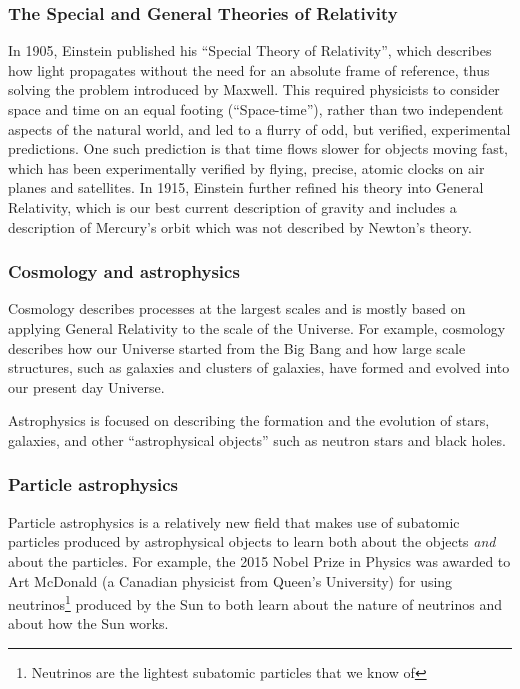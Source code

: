 \subsubsection{The Special and General Theories of Relativity}
In 1905, Einstein published his ``Special Theory of Relativity'', which describes how light propagates without the need for an absolute frame of reference, thus solving the problem introduced by Maxwell. This required physicists to consider space and time on an equal footing (``Space-time''), rather than two independent aspects of the natural world, and led to a flurry of odd, but verified, experimental predictions. One such prediction is that time flows slower for objects moving fast, which has been experimentally verified by flying, precise, atomic clocks on air planes and satellites. In 1915, Einstein further refined his theory into General Relativity, which is our best current description of gravity and includes a description of Mercury's orbit which was not described by Newton's theory.

\subsubsection{Cosmology and astrophysics} 
Cosmology describes processes at the largest scales and is mostly based on applying General Relativity to the scale of the Universe. For example, cosmology describes how our Universe started from the Big Bang and how large scale structures, such as galaxies and clusters of galaxies, have formed and evolved into our present day Universe. 

Astrophysics is focused on describing the formation and the evolution of stars, galaxies, and other ``astrophysical objects'' such as neutron stars and black holes. 

\subsubsection{Particle astrophysics}
Particle astrophysics is a relatively new field that makes use of subatomic particles produced by astrophysical objects to learn both about the objects \textit{and} about the particles. For example, the 2015 Nobel Prize in Physics was awarded to Art McDonald (a Canadian physicist from Queen's University) for using neutrinos\footnote{Neutrinos are the lightest subatomic particles that we know of} produced by the Sun to both learn about the nature of neutrinos and about how the Sun works. 

